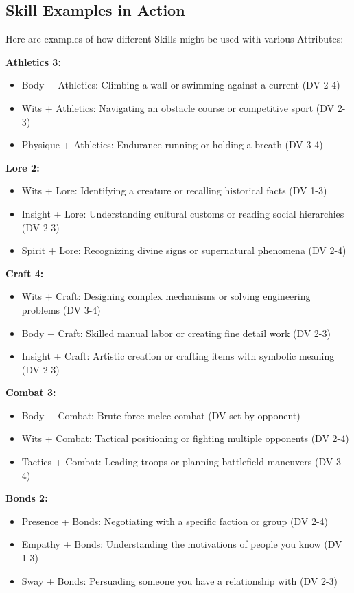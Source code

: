 \subsection*{Skill Examples in Action}

Here are examples of how different Skills might be used with various Attributes:

\textbf{Athletics 3:}
\begin{itemize}
  \item Body + Athletics: Climbing a wall or swimming against a current (DV 2-4)
  \item Wits + Athletics: Navigating an obstacle course or competitive sport (DV 2-3)
  \item Physique + Athletics: Endurance running or holding a breath (DV 3-4)
\end{itemize}

\textbf{Lore 2:}
\begin{itemize}
  \item Wits + Lore: Identifying a creature or recalling historical facts (DV 1-3)
  \item Insight + Lore: Understanding cultural customs or reading social hierarchies (DV 2-3)
  \item Spirit + Lore: Recognizing divine signs or supernatural phenomena (DV 2-4)
\end{itemize}

\textbf{Craft 4:}
\begin{itemize}
  \item Wits + Craft: Designing complex mechanisms or solving engineering problems (DV 3-4)
  \item Body + Craft: Skilled manual labor or creating fine detail work (DV 2-3)
  \item Insight + Craft: Artistic creation or crafting items with symbolic meaning (DV 2-3)
\end{itemize}

\textbf{Combat 3:}
\begin{itemize}
  \item Body + Combat: Brute force melee combat (DV set by opponent)
  \item Wits + Combat: Tactical positioning or fighting multiple opponents (DV 2-4)
  \item Tactics + Combat: Leading troops or planning battlefield maneuvers (DV 3-4)
\end{itemize}

\textbf{Bonds 2:}
\begin{itemize}
  \item Presence + Bonds: Negotiating with a specific faction or group (DV 2-4)
  \item Empathy + Bonds: Understanding the motivations of people you know (DV 1-3)
  \item Sway + Bonds: Persuading someone you have a relationship with (DV 2-3)
\end{itemize}

